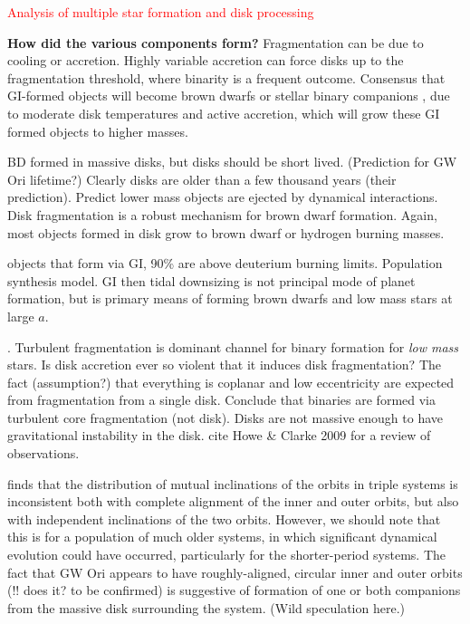 \documentclass[twocolumn]{aastex61}
\newcommand{\todo}[1]{ \textcolor{red}{#1}}
\begin{document}


\todo{Analysis of multiple star formation and disk processing}

\textbf{How did the various components form?}
Fragmentation can be due to cooling or accretion. Highly variable accretion can force disks up to the fragmentation threshold, where binarity is a frequent outcome. Consensus that GI-formed objects will become brown dwarfs or stellar binary companions \citep{kratter10}, due to moderate disk temperatures and active accretion, which will grow these GI formed objects to higher masses.

\citep{stamatellos09} BD formed in massive disks, but disks should be short lived. (Prediction for GW Ori lifetime?) Clearly disks are older than a few thousand years (their prediction). Predict lower mass objects are ejected by dynamical interactions. Disk fragmentation is a robust mechanism for brown dwarf formation. Again, most objects formed in disk grow to brown dwarf or hydrogen burning masses.

\citep{forgan13} objects that form via GI, 90\% are above deuterium burning limits. Population synthesis model. GI then tidal downsizing is not principal mode of planet formation, but is primary means of forming brown dwarfs and low mass stars at large $a$.

\citep{offner10}.
Turbulent fragmentation is dominant channel for binary formation for \emph{low mass} stars. Is disk accretion ever so violent that it induces disk fragmentation? The fact (assumption?) that everything is coplanar and low eccentricity are expected from fragmentation from a single disk. Conclude that binaries are formed via turbulent core fragmentation (not disk). Disks are not massive enough to have gravitational instability in the disk. \citet{offner10} cite Howe \& Clarke 2009 for a review of observations.

\citet{tokovinin97} finds that the distribution of mutual inclinations of the orbits in triple systems is inconsistent both with complete alignment of the inner and outer orbits, but also with independent inclinations of the two orbits.  However, we should note that this is for a population of much older systems, in which significant dynamical evolution could have occurred, particularly for the shorter-period systems.  The fact that GW Ori appears to have roughly-aligned, circular inner and outer orbits (!! does it?  to be confirmed) is suggestive of formation of one or both companions from the massive disk surrounding the system.  (Wild speculation here.)
\end{document}
